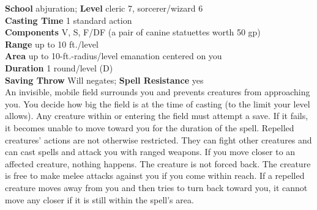 \textbf{School} abjuration; \textbf{Level} cleric 7, sorcerer/wizard 6\\
\textbf{Casting Time} 1 standard action\\
\textbf{Components} V, S, F/DF (a pair of canine statuettes worth 50 gp)\\
\textbf{Range} up to 10 ft./level\\
\textbf{Area} up to 10-ft.-radius/level emanation centered on you\\
\textbf{Duration} 1 round/level (D)\\
\textbf{Saving Throw }Will negates; \textbf{Spell Resistance} yes\\
An invisible, mobile field surrounds you and prevents creatures from approaching you. You decide how big the field is at the time of casting (to the limit your level allows). Any creature within or entering the field must attempt a save. If it fails, it becomes unable to move toward you for the duration of the spell. Repelled creatures' actions are not otherwise restricted. They can fight other creatures and can cast spells and attack you with ranged weapons. If you move closer to an affected creature, nothing happens. The creature is not forced back. The creature is free to make melee attacks against you if you come within reach. If a repelled creature moves away from you and then tries to turn back toward you, it cannot move any closer if it is still within the spell's area.\\
